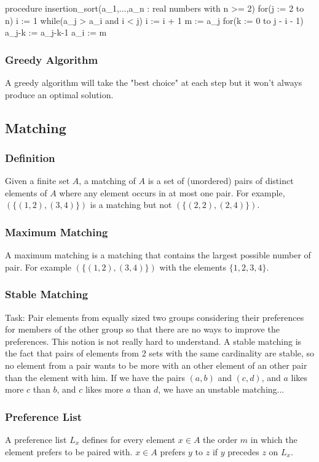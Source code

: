 \documentclass{article}
\begin{document}
\begin{mylisting}
	procedure insertion_sort(a_1,...,a_n : real numbers with n >= 2)
		for(j := 2 to n)
			i := 1
			while(a_j > a_i and i < j)
				i := i + 1
			m := a_j
			for(k := 0 to j - i - 1)
				a_{j-k} := a_{j-k-1}
			a_i := m				
\end{mylisting}

\subsubsection{Greedy Algorithm} A greedy algorithm will take the "best choice" at each step but it won't always produce an optimal solution.

\subsection{Matching}
\subsubsection{Definition} Given a finite set $ A $, a matching of $ A $ is a set of (unordered) pairs of distinct elements of $ A $ where any element occurs in at most one pair. For example, $ (\{(1,2),(3,4)\}) $ is a matching but not $ (\{(2,2),(2,4)\}) $.

\subsubsection{Maximum Matching} A maximum matching is a matching that contains the largest possible number of pair. For example $ (\{(1,2),(3,4)\}) $ with the elements $ \{1,2,3,4\} $.


\subsubsection{Stable Matching} Task: Pair elements from equally sized two groups considering their preferences for members of the other group so that there are no ways to improve the preferences. This notion is not really hard to understand. A stable matching is the fact that pairs of elements from 2 sets with the same cardinality are stable, so no element from a pair wants to be more with an other element of an other pair than the element with him. If we have the pairs $ (a,b) $ and $ (c,d) $, and $ a $ likes more $ c $ than $ b $, and $ c $ likes more $ a $ than $ d $, we have an unstable matching...

\subsubsection{Preference List} A preference list $ L_x $ defines for every element $ x \in A $ the order $ m $ in which the element prefers to be paired with. $ x \in A $ prefers $ y $ to $ z $ if $ y $ precedes $ z $ on $ L_x $.
\end{document}
